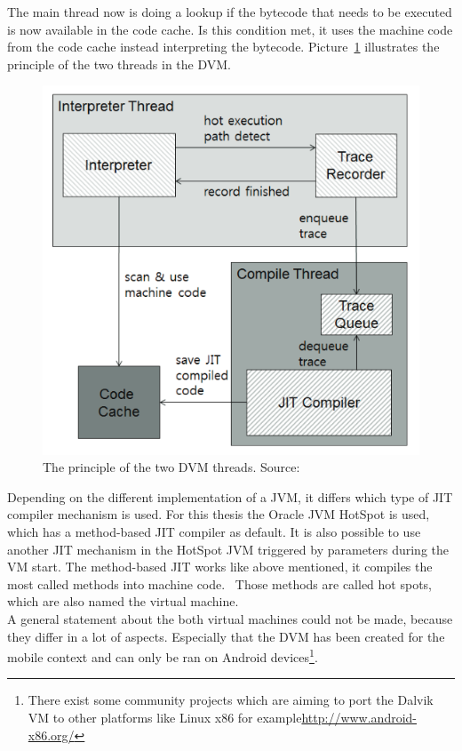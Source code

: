 The main thread now is doing a lookup if the bytecode that needs to be executed is now available in the code cache.
Is this condition met, it uses the machine code from the code cache instead interpreting the bytecode.\cite{oh2012evaluation}
Picture~\ref{fig:dvm-threads} illustrates the principle of the two threads in the DVM.\\
\begin{figure}[h]
\begin{center}
\includegraphics[scale=0.5]{images/dvm-threads.png} 
\caption{The principle of the two DVM threads. Source:\cite{oh2012evaluation}}
\label{fig:dvm-threads}
\end{center}
\end{figure}

Depending on the different implementation of a JVM, it differs which type of JIT compiler mechanism is used.
For this thesis the Oracle JVM HotSpot is used, which has a method-based JIT compiler as default.
It is also possible to use another JIT mechanism in the HotSpot JVM triggered by parameters during the VM start.
The method-based JIT works like above mentioned, it compiles the most called methods into machine code.~\cite{kotzmann2008design}
Those methods are called hot spots, which are also named the virtual machine.
\cite{paleczny2001java}
\\
A general statement about the both virtual machines could not be made, because they differ in a lot of aspects.
Especially that the DVM has been created for the mobile context and can only be ran on Android devices\footnote{There exist some community projects which are aiming to port the Dalvik VM to other platforms like Linux x86 for example\url{http://www.android-x86.org/}}.


